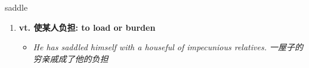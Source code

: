 
\begin{frame}
{\huge saddle}
\begin{center}
\begin{enumerate}\Large
  \item \textbf{vt. 使某人负担: to load or burden}
  \begin{itemize}
    \item \em{\Large{He has saddled himself with a houseful of impecunious relatives. 一屋子的穷亲戚成了他的负担}}
  \end{itemize}
\end{enumerate}
\end{center}
\end{frame}
